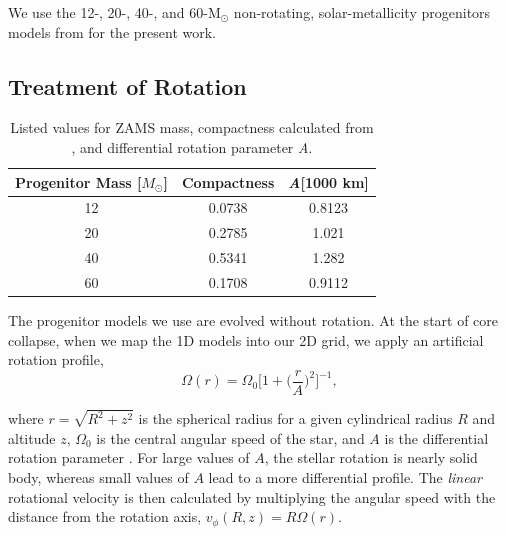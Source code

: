\documentclass[twocolumn,times]{aastex62}  %
\newcommand{\Msun}{\ensuremath{\mathrm{M}_\odot}\xspace}
\begin{document}
We use the 12-, 20-, 40-, and 60-\Msun non-rotating, solar-metallicity progenitors models from \citet{Suk:2016} for the present work.

\subsection{Treatment of Rotation}


\begin{table}[t]
\begin{tabular}{c|c|c}
Progenitor Mass [$M_\odot$] & Compactness & \textit{A}[1000 km] \\
\hline
12  & 0.0738 &         0.8123             \\
20  & 0.2785 &         1.021            \\
40  & 0.5341 &         1.282           \\
60  & 0.1708 &         0.9112          
\end{tabular}
\caption{Listed values for ZAMS mass, compactness calculated from \citet{Suk:2016}, and differential rotation parameter \textit{A}.}
\label{table:compact}
\end{table}

The progenitor models we use are evolved without rotation.
At the start of core collapse, when we map the 1D models into our 2D grid, we apply an artificial rotation profile,
\begin{equation}
    \Omega(r) = \Omega_0 \bigg[1 + \bigg(\frac{r}{A}\bigg)^2 \bigg]^{-1}, 
    \label{eq:omega}
\end{equation}

where $r = \sqrt{R^2 + z^2}$ is the spherical radius for a given cylindrical radius $R$ and altitude $z$, $\Omega_0$ is the central angular speed of the star, and $A$ is the differential rotation parameter \citep{eriguchi:1984}.  For large values of $A$, the stellar rotation is nearly solid body, whereas small values of $A$ lead to a more differential profile. 
The {\it linear} rotational velocity is then calculated by multiplying the angular speed with the distance from the rotation axis, $v_\phi (R, z) = R \Omega (r) $. 
\end{document}
